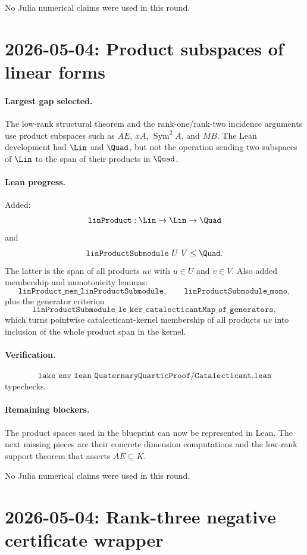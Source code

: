 \documentclass[11pt]{article}
\begin{document}
No Julia numerical claims were used in this round.

\section*{2026-05-04: Product subspaces of linear forms}

\paragraph{Largest gap selected.}
The low-rank structural theorem and the rank-one/rank-two incidence arguments
use product subspaces such as \(AE\), \(xA\), \(\operatorname{Sym}^2A\), and
\(MB\).  The Lean development had \(\Lin\) and \(\Quad\), but not the
operation sending two subspaces of \(\Lin\) to the span of their products in
\(\Quad\).

\paragraph{Lean progress.}
Added:
\[
\texttt{linProduct} : \Lin\to\Lin\to\Quad
\]
and
\[
\texttt{linProductSubmodule}\ U\ V\le\Quad.
\]
The latter is the span of all products \(uv\) with \(u\in U\) and \(v\in V\).
Also added membership and monotonicity lemmas:
\[
\texttt{linProduct\_mem\_linProductSubmodule},\qquad
\texttt{linProductSubmodule\_mono},
\]
plus the generator criterion
\[
\texttt{linProductSubmodule\_le\_ker\_catalecticantMap\_of\_generators},
\]
which turns pointwise catalecticant-kernel membership of all products
\(uv\) into inclusion of the whole product span in the kernel.

\paragraph{Verification.}
\[
\texttt{lake env lean QuaternaryQuarticProof/Catalecticant.lean}
\]
typechecks.

\paragraph{Remaining blockers.}
The product spaces used in the blueprint can now be represented in Lean.  The
next missing pieces are their concrete dimension computations and the
low-rank support theorem that asserts \(AE\subseteq K\).

No Julia numerical claims were used in this round.

\section*{2026-05-04: Rank-three negative certificate wrapper}
\end{document}
